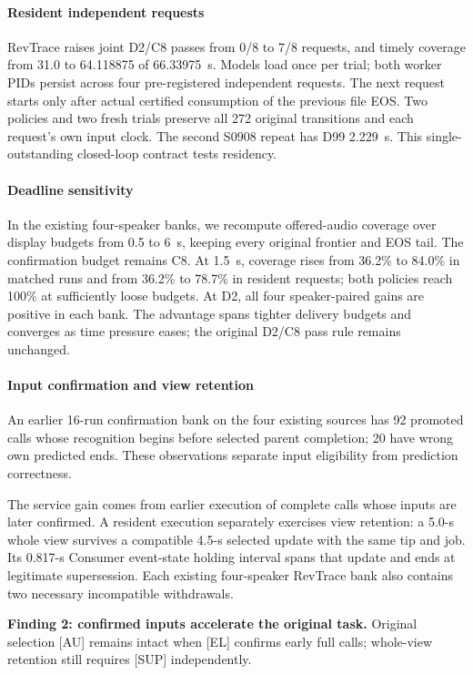 \paragraph{Resident independent requests}
RevTrace raises joint D2/C8 passes from 0/8 to 7/8 requests, and timely
coverage from 31.0 to 64.118875 of 66.33975~s. Models load once per trial;
both worker PIDs persist across four pre-registered independent requests.
The next request starts only after actual certified consumption of the
previous file EOS. Two policies and two fresh trials preserve all 272
original transitions and each request's own input clock. The second
S0908 repeat has D99 2.229~s. This single-outstanding closed-loop contract
tests residency.

\paragraph{Deadline sensitivity}
In the existing four-speaker banks, we recompute offered-audio coverage over display budgets
from 0.5 to 6~s, keeping every original frontier and EOS tail.
The confirmation budget remains C8.
At 1.5~s, coverage rises from 36.2\% to 84.0\% in matched runs and
from 36.2\% to 78.7\% in resident requests; both policies reach 100\%
at sufficiently loose budgets. At D2, all four speaker-paired gains
are positive in each bank. The advantage spans tighter delivery budgets
and converges as time pressure eases; the original D2/C8 pass rule remains
unchanged.

\paragraph{Input confirmation and view retention}
An earlier 16-run confirmation bank on the four existing sources
has 92 promoted calls whose recognition
begins before selected parent completion; 20 have wrong own predicted
ends. These observations separate input eligibility from prediction correctness.

The service gain comes from earlier execution of complete
calls whose inputs are later confirmed. A resident execution separately
exercises view retention: a 5.0-s whole view survives a compatible 4.5-s
selected update with the same tip and job. Its 0.817-s Consumer event-state
holding interval spans that update and ends at legitimate supersession.
Each existing four-speaker RevTrace bank also contains two necessary
incompatible withdrawals.
\par\noindent\textbf{Finding 2: confirmed inputs accelerate the original task.}
Original selection [AU] remains intact when [EL] confirms early full calls;
whole-view retention still requires [SUP] independently.
